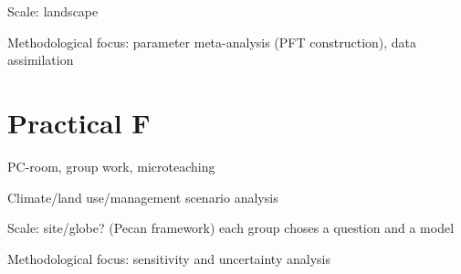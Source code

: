 \documentclass[]{book}
\begin{document}
Scale: landscape

Methodological focus: parameter meta-analysis (PFT construction), data
assimilation

\chapter*{Practical F}\label{practical-f}

PC-room, group work, microteaching

Climate/land use/management scenario analysis

Scale: site/globe? (Pecan framework) each group choses a question and a
model

Methodological focus: sensitivity and uncertainty analysis


\end{document}
